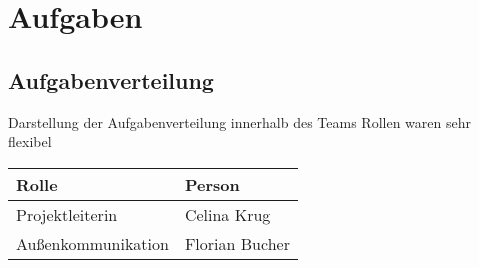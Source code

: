 \chapter{Aufgaben}

\section{Aufgabenverteilung}

Darstellung der Aufgabenverteilung innerhalb des Teams
Rollen waren sehr flexibel

    \begin{center}
        \begin{tabular}{ |l|l| }
            \hline
            Rolle & Person \\
            \hline
            \hline
            Projektleiterin & Celina Krug \\ 
            \hline
            Außenkommunikation & Florian Bucher \\ 
            \hline
        \end{tabular}
    \end{center}
